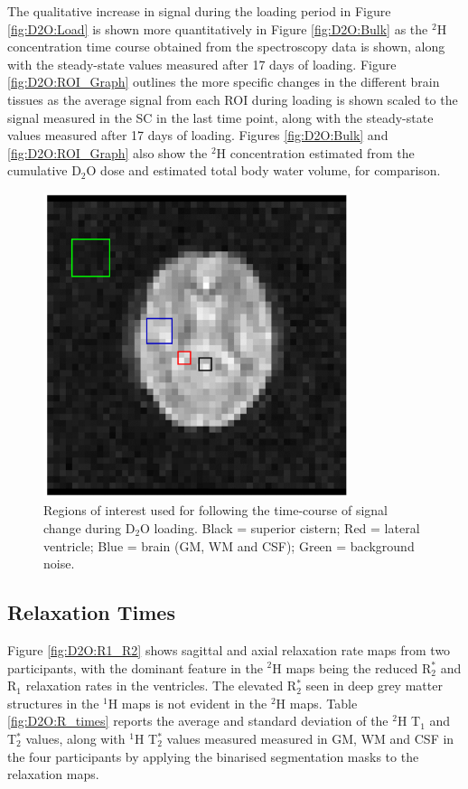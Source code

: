 \documentclass[class=article, crop=false]{standalone}
\begin{document}
The qualitative increase in signal during the loading period in Figure \ref{fig:D2O:Load} is shown more quantitatively in Figure \ref{fig:D2O:Bulk} as the $^2$H concentration time course obtained from the spectroscopy data is shown, along with the steady-state values measured after 17 days of loading. Figure \ref{fig:D2O:ROI_Graph} outlines the more specific changes in the different brain tissues as the average signal from each ROI during loading is shown scaled to the signal measured in the SC in the last time point, along with the steady-state values measured after 17 days of loading. Figures \ref{fig:D2O:Bulk} and \ref{fig:D2O:ROI_Graph} also show the $^2$H concentration estimated from the cumulative D$_2$O dose and estimated total body water volume, for comparison. 

\begin{figure}[H]
    \centering
    \includegraphics[width=0.8\textwidth]{Figures/D2O/ROI.png}
    \caption{Regions of interest used for following the time-course of signal change during D$_2$O loading. Black = superior cistern; Red = lateral ventricle; Blue = brain (GM, WM and CSF); Green = background noise.}
    \label{fig:D2O:ROI}
\end{figure}

\subsection{Relaxation Times}

Figure \ref{fig:D2O:R1_R2} shows sagittal and axial relaxation rate maps from two participants, with the dominant feature in the $^2$H maps being the reduced R$_2^*$ and R$_1$ relaxation rates in the ventricles. The elevated R$_2^*$ seen in deep grey matter structures in the $^1$H maps is not evident in the $^2$H maps. Table \ref{fig:D2O:R_times} reports the average and standard deviation of the $^2$H T$_1$ and T$_2^*$ values, along with $^1$H T$_2^*$ values measured measured in GM, WM and CSF in the four participants by applying the binarised segmentation masks to the relaxation maps.
\end{document}
